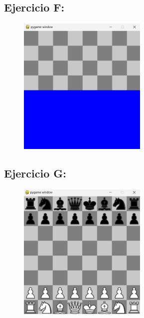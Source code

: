 \documentclass{article}
\begin{document}
	\subsection{Ejercicio F:}
	
	\begin{figure}[H]
		\centering
		\includegraphics[width=0.55\textwidth,keepaspectratio]{img/Picture F.png}
	\end{figure}	

	\subsection{Ejercicio G:}
	
	\begin{figure}[H]
		\centering
		\includegraphics[width=0.55\textwidth,keepaspectratio]{img/Picture G.png}
	\end{figure}	
\end{document}
